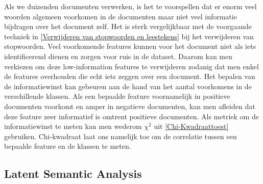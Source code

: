 Als we duizenden documenten verwerken, is het te voorspellen dat er enorm veel woorden algemeen voorkomen in de documenten maar niet veel informatie bijdragen over het document zelf. Het is sterk vergelijkbaar met de voorgaande techniek in \ref{Verwijderen van stopwoorden en leestekens} bij het verwijderen van stopwoorden. Veel voorkomende features kunnen voor het document niet als iets identificerend dienen en zorgen voor ruis in de dataset. Daarom kan men verkiezen om deze low-information features te verwijderen zodanig dat men enkel de features overhouden die echt iets zeggen over een document. Het bepalen van de informatiewinst kan gebeuren aan de hand van het aantal voorkomens in de verschillende klassen. Als een bepaalde feature voornamelijk in positieve documenten voorkomt en amper in negatieve documenten, kan men afleiden dat deze feature zeer informatief is omtrent positieve documenten. Als metriek om de informatiewinst te meten kan men wederom ${\chi}^2$ uit \ref{Chi-Kwadraattoest} gebruiken. Chi-kwadraat laat ons namelijk toe om de correlatie tussen een bepaalde feature en de klassen te meten.
%
\subsection{Latent Semantic Analysis}\label{Latent Semantic Analysis}

